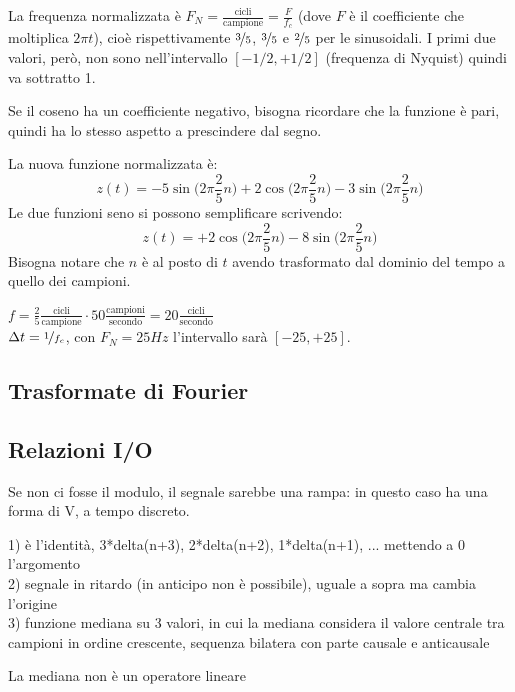 La frequenza normalizzata è $F_N = \frac{\text{cicli}}{\text{campione}} = \frac{F}{f_c}$ (dove $F$ è il coefficiente che moltiplica $2\pi t$), cioè rispettivamente $\nicefrac{3}{5}$, $\nicefrac{3}{5}$ e $\nicefrac{2}{5}$ per le sinusoidali. I primi due valori, però, non sono nell'intervallo $[-1/2, +1/2]$ (frequenza di Nyquist) quindi va sottratto 1. 

Se il coseno ha un coefficiente negativo, bisogna ricordare che la funzione è pari, quindi ha lo stesso aspetto a prescindere dal segno.

La nuova funzione normalizzata è:
$$z(t) = -5\sin\Big(2\pi \frac{2}{5}n\Big) + 2\cos\Big(2\pi \frac{2}{5}n\Big) - 3\sin\Big(2\pi \frac{2}{5}n\Big)$$
Le due funzioni seno si possono semplificare scrivendo: 
$$z(t) = +2\cos\Big(2\pi \frac{2}{5}n\Big) - 8\sin\Big(2\pi \frac{2}{5}n\Big)$$
Bisogna notare che $n$ è al posto di $t$ avendo trasformato dal dominio del tempo a quello dei campioni. 

$f = \frac{2}{5} \frac{\text{cicli}}{\text{campione}} \cdot 50 \frac{\text{campioni}}{\text{secondo}} = 20 \frac{\text{cicli}}{\text{secondo}}$ \\
$\Delta t = \nicefrac{1}{f_c}$, con $F_N = 25Hz$ l'intervallo sarà $[-25, +25]$.

\subsection{Trasformate di Fourier}
\subsubsection{}

\subsection{Relazioni I/O}
Se non ci fosse il modulo, il segnale sarebbe una rampa: in questo caso ha una forma di V, a tempo discreto. 

1) è l'identità, 3*delta(n+3), 2*delta(n+2), 1*delta(n+1), ... mettendo a 0 l'argomento \\
2) segnale in ritardo (in anticipo non è possibile), uguale a sopra ma cambia l'origine \\
3) funzione mediana su 3 valori, in cui la mediana considera il valore centrale tra campioni in ordine crescente, sequenza bilatera con parte causale e anticausale

La mediana non è un operatore lineare


